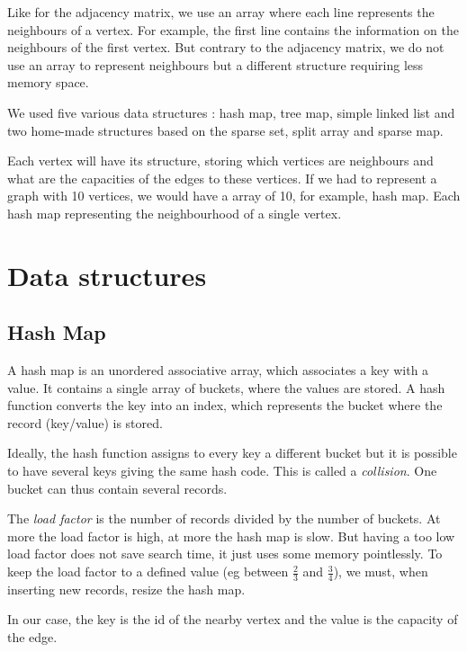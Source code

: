 Like for the adjacency matrix, we use an array where each line represents the neighbours of a vertex. For example, the first line contains the information on the neighbours of the first vertex. But contrary to the adjacency matrix, we do not use an array to represent neighbours but a different structure requiring less memory space. \newline

We used five various data structures : hash map, tree map, simple linked list and two home-made structures based on the sparse set, split array and sparse map. 

Each vertex will have its structure, storing which vertices are neighbours and what are the capacities of the edges to these vertices. If we had to represent a graph with 10 vertices, we would have a array of 10, for example, hash map. Each hash map representing the neighbourhood of a single vertex.

\section{Data structures}
\subsection{Hash Map}
A hash map is an unordered associative array, which associates a key with a value. It contains a single array of buckets, where the values are stored. A hash function converts the key into an index, which represents the bucket where the record (key/value) is stored. \newline

Ideally, the hash function assigns to every key a different bucket but it is possible to have several keys giving the same hash code. This is called a \textit{collision}. One bucket can thus contain several records. \newline

The \textit{load factor} is the number of records divided by the number of buckets.  At more the load factor is high, at more the hash map is slow. But having a too low load factor does not save search time, it just uses some memory pointlessly. To keep the load factor to a defined value (eg between $\frac{2}{3}$ and $\frac{3}{4}$), we must, when inserting new records, resize the hash map. \newline

In our case, the key is the id of the nearby vertex and the value is the capacity of the edge.

